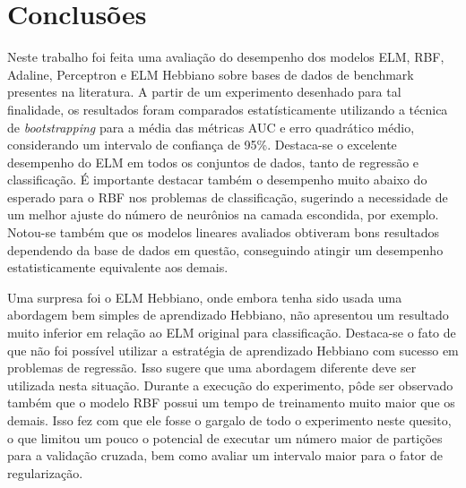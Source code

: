 \documentclass[conference]{IEEEtran}
\begin{document}
%	
%	


	
	\section{Conclusões}
	
	Neste trabalho foi feita uma avaliação do desempenho dos modelos ELM, RBF, Adaline, Perceptron e ELM Hebbiano sobre bases de dados de benchmark presentes na literatura. A partir de um experimento desenhado para tal finalidade, os resultados foram comparados estatísticamente utilizando a técnica de \textit{bootstrapping} para a média das métricas AUC e erro quadrático médio, considerando um intervalo de confiança de 95\%. Destaca-se o excelente desempenho do ELM em todos os conjuntos de dados, tanto de regressão e classificação. É importante destacar também o desempenho muito abaixo do esperado para o RBF nos problemas de classificação, sugerindo a necessidade de um melhor ajuste do número de neurônios na camada escondida, por exemplo. Notou-se também que os modelos lineares avaliados obtiveram bons resultados dependendo da base de dados em questão, conseguindo atingir um desempenho estatisticamente equivalente aos demais.
	
	Uma surpresa foi o ELM Hebbiano, onde embora tenha sido usada uma abordagem bem simples de aprendizado Hebbiano, não apresentou um resultado muito inferior em relação ao ELM original para classificação. Destaca-se o fato de que não foi possível utilizar a estratégia de aprendizado Hebbiano com sucesso em problemas de regressão. Isso sugere que uma abordagem diferente deve ser utilizada nesta situação. Durante a execução do experimento, pôde ser observado também que o modelo RBF possui um tempo de treinamento muito maior que os demais. Isso fez com que ele fosse o gargalo de todo o experimento neste quesito, o que limitou um pouco o potencial de executar um número maior de partições para a validação cruzada, bem como avaliar um intervalo maior para o fator de regularização. 
	
\end{document}
